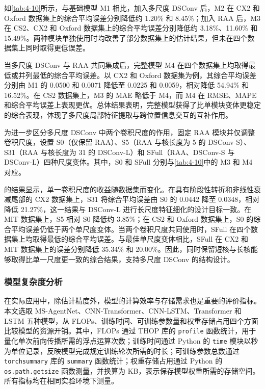 如\cref{tab:4-10}所示，与基础模型 M1 相比，加入多尺度 DSConv 后，M2 在 CX2 和 Oxford 数据集上的综合平均误差分别降低约 1.20\% 和 8.45\%；加入 RAA 后，M3 在 CS2、CX2 和 Oxford 数据集上的综合平均误差分别降低约 3.18\%、11.60\% 和 15.49\%。两种模块单独使用时均改善了部分数据集上的估计结果，但未在四个数据集上同时取得更低误差。

当多尺度 DSConv 与 RAA 共同集成后，完整模型 M4 在四个数据集上均取得最低或并列最低的综合平均误差。以 CX2 和 Oxford 数据集为例，其综合平均误差分别由 M1 的 0.0500 和 0.0071 降低至 0.0225 和 0.0059，相对降低 54.94\% 和 16.52\%。在 CS2 数据集上，M3 的 MAE 略低于 M4，而 M4 在 RMSE、MAPE 和综合平均误差上表现更优。总体结果表明，完整模型获得了比单模块变体更稳定的综合表现，体现了多尺度局部特征提取与跨位置信息交互的互补作用。

为进一步区分多尺度 DSConv 中两个卷积尺度的作用，固定 RAA 模块并仅调整卷积尺度，设置 S0（仅保留 RAA）、S5（RAA 与核长度为 5 的 DSConv-S）、S31（RAA 与核长度为 31 的 DSConv-L）和 SFull（RAA、DSConv-S 与 DSConv-L）四种尺度变体。其中，S0 和 SFull 分别与\cref{tab:4-10}中的 M3 和 M4 对应。

的结果显示，单一卷积尺度的收益随数据集而变化。在具有阶段性转折和非线性衰减尾部的 CX2 数据集上，S31 将综合平均误差由 S0 的 0.0442 降至 0.0348，相对降低 21.27\%，这一结果与 DSConv-L 进行长尺度特征细化的设计目标一致。在 MIT 数据集上，S5 相对 S0 降低约 3.85\%；在 CS2 和 Oxford 数据集上，S0 的综合平均误差仍低于两个单尺度变体。当两个卷积尺度共同使用时，SFull 在四个数据集上均取得最低的综合平均误差。与最佳单尺度变体相比，SFull 在 CX2 和 MIT 数据集上的误差分别降低 35.34\% 和 20.00\%。因此，同时保留短核与长核能够取得比单一尺度更一致的综合结果，支持多尺度 DSConv 的结构设计。



\FloatBarrier

\subsubsection{模型复杂度分析}

在实际应用中，除估计精度外，模型的计算效率与存储需求也是重要的评价指标\cite{ref77}。本文选取 MS-AgentNet、CNN-Transformer、CNN-LSTM、Transformer 和 LSTM 五种模型，从 FLOPs、训练时间、可训练参数量和权重存储占用四个方面比较模型的资源开销。其中，FLOPs 通过 THOP 库的 \texttt{profile} 函数统计，用于量化单次前向传播所需的浮点运算次数；训练时间通过 Python 的 \texttt{time} 模块以秒为单位记录，反映模型完成规定训练轮次所需的时长；可训练参数总数通过 \texttt{torchsummary} 库的 \texttt{summary} 函数统计；权重存储占用通过 Python 的 \texttt{os.path.getsize} 函数测量，并换算为 KB，表示保存模型权重所需的存储空间。所有指标均在相同实验环境下测量。

